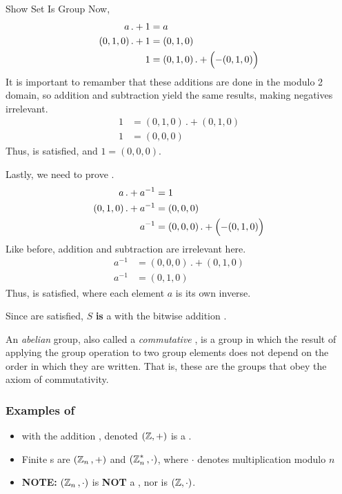 \begin{example}{Show Set Is Group}
  Now, 
  \begin{align*}
    a \, .+ 1 &= a \\
    (0, 1, 0) \, .+ 1 &= (0, 1, 0) \\
    1 &= (0, 1, 0) \, .+ \Bigl( -(0, 1, 0) \Bigr)
  \end{align*}
  It is important to remamber that these additions are done in the modulo 2 domain, so addition and subtraction yield the same results, making negatives irrelevant.
  \begin{align*}
    1 &= (0, 1, 0) \, .+ (0, 1, 0) \\
    1 &= (0, 0, 0)
  \end{align*}
  Thus,  is satisfied, and $1 = (0, 0, 0)$.

  Lastly, we need to prove .
  \begin{align*}
    a \, .+ a^{-1} &= 1 \\
    (0, 1, 0) \, .+ a^{-1} &= (0, 0, 0) \\
    a^{-1} &= (0, 0, 0) \, .+ \Bigl( -(0, 1, 0) \Bigr)
  \end{align*}
  Like before, addition and subtraction are irrelevant here.
  \begin{align*}
    a^{-1} &= (0, 0, 0) \, .+ (0, 1, 0) \\
    a^{-1} &= (0, 1, 0)
  \end{align*}
  Thus,  is satisfied, where each element $a$ is its own inverse.

  Since  are satisfied, $S$ \textbf{is} a  with the bitwise addition .
\end{example}

\begin{definition}[Abelian]\label{def:Abelian}
  An \emph{abelian} group, also called a \emph{commutative }, is a group in which the result of applying the group operation to two group elements does not depend on the order in which they are written.
  That is, these are the groups that obey the axiom of commutativity.
\end{definition}

\subsubsection{Examples of }\label{subsubsec:Examples_of_Groups}
\begin{itemize}[noitemsep]
\item \TextAllIntegers{} with the addition , denoted $(\operatorname{\mathbb{Z}}, +)$ is a .
\item Finite s are $(\operatorname{\mathbb{Z}}_{n}{}, +)$ and $(\operatorname{\mathbb{Z}}_{n}^{*}{}, \cdot)$, where $\cdot$ denotes multiplication modulo $n$
\item \textbf{NOTE:} $(\operatorname{\mathbb{Z}}_{n}{}, \cdot)$ is \textbf{NOT} a , nor is $(\operatorname{\mathbb{Z}}, \cdot)$.
\end{itemize}

